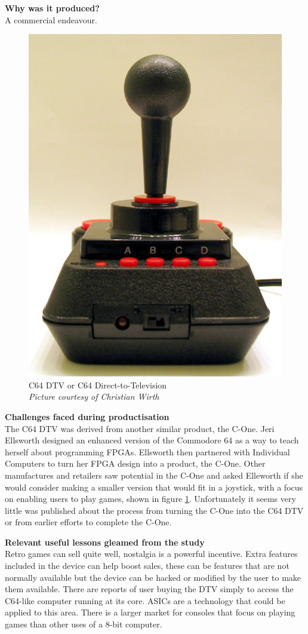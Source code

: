 \textbf{Why was it produced?}\\
A commercial endeavour. 

\begin{figure} \begin{center}
\includegraphics[width=.3\linewidth]{pics/C64_DTV} 
\end{center} 
\caption{C64 DTV or C64 Direct-to-Television \\ \textit{\small{Picture courtesy of Christian Wirth}}}
\label{C64_DTV}
\end{figure}

\textbf{Challenges faced during productisation}\\
The C64 DTV was derived from another similar product, the C-One. Jeri Ellsworth designed an enhanced version of the Commodore 64 as a way to teach herself about programming FPGAs. Ellsworth then partnered with Individual Computers to turn her FPGA design into a product, the C-One. Other manufactures and retailers saw potential in the C-One and asked Elleworth if she would consider making a smaller version that would fit in a joystick, with a focus on enabling users to play games, shown in figure \ref{C64_DTV}. Unfortunately it seems very little was published about the process from turning the C-One into the C64 DTV or from earlier efforts to complete the C-One.


\textbf{Relevant useful lessons gleamed from the study}\\
Retro games can sell quite well, nostalgia is a powerful incentive.
Extra features included in the device can help boost sales, these can be features that are not normally available but the device can be hacked or modified by the user to make them available. There are reports of user buying the DTV simply to access the C64-like computer running at its core.
ASICs are a technology that could be applied to this area.
There is a larger market for consoles that focus on playing games than other uses of a 8-bit computer.